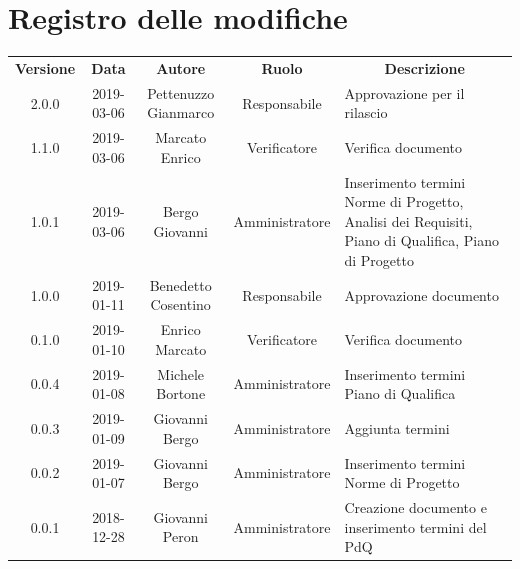 \renewcommand {\footrulewidth}{0.2mm}

\usepackage{lipsum}

	
	\newpage
	\section*{\centering Registro delle modifiche}
	\begin{tabularx}{\textwidth}{ c | c | c | c | X }
		\rowcolor{LightBlue}
		\color{white}\bfseries Versione & \color{white}\bfseries Data & \color{white}\bfseries Autore & \color{white}\bfseries Ruolo & \multicolumn{1}{c}{\color{white}\bfseries Descrizione}\\[0.25cm]
		2.0.0 & 2019-03-06 & Pettenuzzo Gianmarco & Responsabile & Approvazione per il rilascio \\ 
		\hline
		1.1.0 & 2019-03-06 & Marcato Enrico & Verificatore & Verifica documento \\ 
		\hline
		1.0.1 & 2019-03-06 & Bergo Giovanni & Amministratore & Inserimento termini Norme di Progetto, Analisi dei Requisiti, Piano di Qualifica, Piano di Progetto \\ 
		\hline
		1.0.0 & 2019-01-11 & Benedetto Cosentino & Responsabile & Approvazione documento \\ 
		\hline
		0.1.0 & 2019-01-10 & Enrico Marcato & Verificatore & Verifica documento \\ 
		\hline
		0.0.4 & 2019-01-08 & Michele Bortone & Amministratore & Inserimento termini Piano di Qualifica \\ 
		\hline 
		0.0.3 & 2019-01-09 & Giovanni Bergo & Amministratore & Aggiunta termini \\ 
		\hline 
		0.0.2 & 2019-01-07 & Giovanni Bergo & Amministratore & Inserimento termini Norme di Progetto \\ 
		\hline 
		0.0.1 & 2018-12-28 & Giovanni Peron & Amministratore & Creazione documento e \newline inserimento termini del PdQ \\ 
		\hline
	
	\end{tabularx}
	\newpage
	\setcounter{secnumdepth}{0}
	
	
	\printindex
	\newpage

